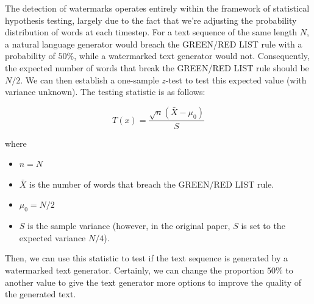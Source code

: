 \documentclass{article}
\begin{document}
The detection of watermarks operates entirely within the framework of statistical hypothesis testing, largely due to the fact that we're adjusting the probability distribution of words at each timestep. For a text sequence of the same length $N$, a natural language generator would breach the GREEN/RED LIST rule with a probability of $ 50\% $, while a watermarked text generator would not. Consequently, the expected number of words that break the GREEN/RED LIST rule should be $N/2$. We can then establish a one-sample $z$-test to test this expected value (with variance unknown). The testing statistic is as follows:

\begin{equation}\label{key}
	T(x) = \dfrac{\sqrt{n}\left(\bar{X} - \mu_0\right)}{S}
\end{equation}

where
\begin{itemize}
	\item $ n = N $
	\item $\bar{X}$ is the number of words that breach the GREEN/RED LIST rule.
	\item $\mu_0 = N/2$
	\item $S$ is the sample variance (however, in the original paper, $S$ is set to the expected variance $N/4$).
\end{itemize}

Then, we can use this statistic to test if the text sequence is generated by a watermarked text generator. Certainly, we can change the proportion $ 50\% $ to another value to give the text generator more options to improve the quality of the generated text.
\end{document}
